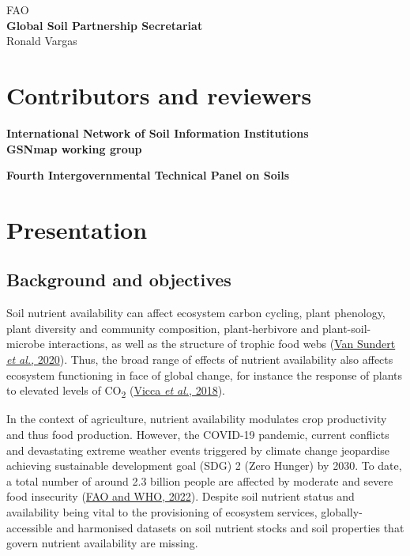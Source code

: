 \documentclass[
  10pt,
  b5paper,
  oneside]{book}
\begin{document}
FAO\\

\textbf{Global Soil Partnership Secretariat}\\
Ronald Vargas\\

\hypertarget{contributors-and-reviewers}{%
\chapter*{Contributors and reviewers}\label{contributors-and-reviewers}}

\textbf{International Network of Soil Information Institutions}\\

\textbf{GSNmap working group}

\textbf{Fourth Intergovernmental Technical Panel on Soils}\\

\mainmatter

\hypertarget{presentation}{%
\chapter{Presentation}\label{presentation}}

\hypertarget{background-and-objectives}{%
\section{Background and objectives}\label{background-and-objectives}}

Soil nutrient availability can affect ecosystem carbon cycling, plant phenology, plant diversity and community composition, plant-herbivore and plant-soil-microbe interactions, as well as the structure of trophic food webs (\protect\hyperlink{ref-vanSundert2020}{Van Sundert \emph{et al.}, 2020}). Thus, the broad range of effects of nutrient availability also affects ecosystem functioning in face of global change, for instance the response of plants to elevated levels of CO\textsubscript{2} (\protect\hyperlink{ref-vicca2018}{Vicca \emph{et al.}, 2018}).

In the context of agriculture, nutrient availability modulates crop productivity and thus food production. However, the COVID-19 pandemic, current conflicts and devastating extreme weather events triggered by climate change jeopardise achieving sustainable development goal (SDG) 2 (Zero Hunger) by 2030. To date, a total number of around 2.3 billion people are affected by moderate and severe food insecurity (\protect\hyperlink{ref-FAO2022}{FAO and WHO, 2022}). Despite soil nutrient status and availability being vital to the provisioning of ecosystem services, globally-accessible and harmonised datasets on soil nutrient stocks and soil properties that govern nutrient availability are missing.
\end{document}

